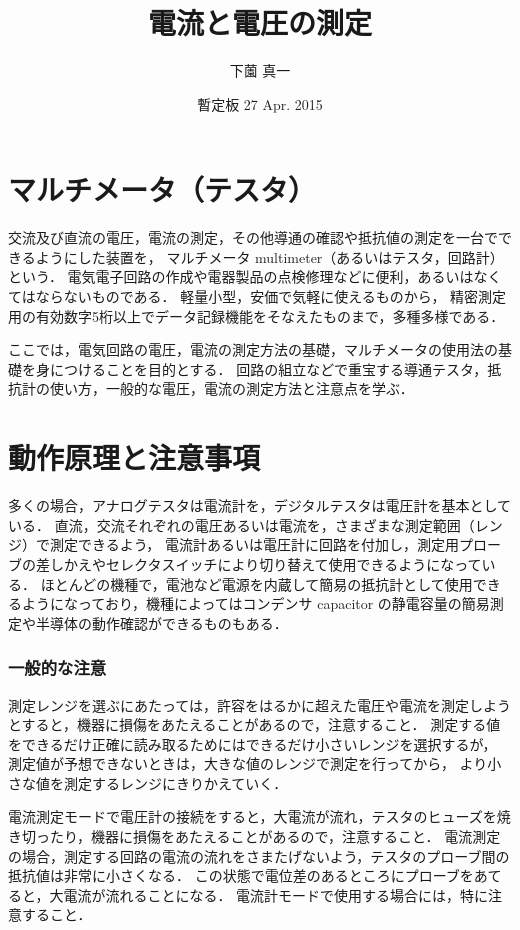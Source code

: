 \documentclass[11pt,sort]{jarticle}
\title{電流と電圧の測定}
\author{下薗 真一}
\date{暫定板 27 Apr. 2015}
\begin{document}
\maketitle

\section{マルチメータ（テスタ）}

交流及び直流の電圧，電流の測定，その他導通の確認や抵抗値の測定を一台でできるようにした装置を，
マルチメータ multimeter（あるいはテスタ，回路計）という．
電気電子回路の作成や電器製品の点検修理などに便利，あるいはなくてはならないものである．
軽量小型，安価で気軽に使えるものから，
精密測定用の有効数字5桁以上でデータ記録機能をそなえたものまで，多種多様である．

ここでは，電気回路の電圧，電流の測定方法の基礎，マルチメータの使用法の基礎を身につけることを目的とする．
回路の組立などで重宝する導通テスタ，抵抗計の使い方，一般的な電圧，電流の測定方法と注意点を学ぶ．

\section{動作原理と注意事項}
多くの場合，アナログテスタは電流計を，デジタルテスタは電圧計を基本としている．
直流，交流それぞれの電圧あるいは電流を，さまざまな測定範囲（レンジ）で測定できるよう，
電流計あるいは電圧計に回路を付加し，測定用プローブの差しかえやセレクタスイッチにより切り替えて使用できるようになっている．
ほとんどの機種で，電池など電源を内蔵して簡易の抵抗計として使用できるようになっており，機種によってはコンデンサ capacitor の静電容量の簡易測定や半導体の動作確認ができるものもある．

\subsubsection*{一般的な注意}
測定レンジを選ぶにあたっては，許容をはるかに超えた電圧や電流を測定しようとすると，機器に損傷をあたえることがあるので，注意すること．
測定する値をできるだけ正確に読み取るためにはできるだけ小さいレンジを選択するが，
測定値が予想できないときは，大きな値のレンジで測定を行ってから，
より小さな値を測定するレンジにきりかえていく．


電流測定モードで電圧計の接続をすると，大電流が流れ，テスタのヒューズを焼き切ったり，機器に損傷をあたえることがあるので，注意すること．
電流測定の場合，測定する回路の電流の流れをさまたげないよう，テスタのプローブ間の抵抗値は非常に小さくなる．
この状態で電位差のあるところにプローブをあてると，大電流が流れることになる．
電流計モードで使用する場合には，特に注意すること．
\end{document}

